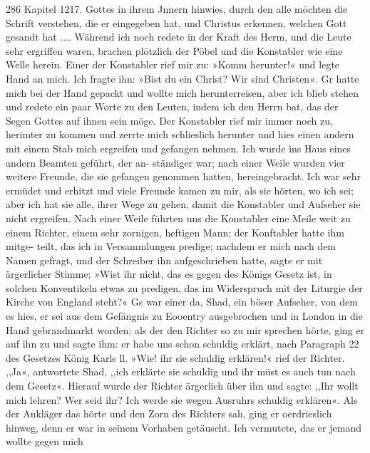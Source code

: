 286 Kapitel 1217.
Gottes in ihrem Jnnern hinwies, durch den alle möchten die
Schrift verstehen, die er eingegeben hat, und Christus erkennen,
welchen Gott gesandt hat .... Während ich noch redete in der
Kraft des Herm, und die Leute sehr ergriffen waren, brachen
plötzlich der Pöbel und die Konstabler wie eine Welle herein.
Einer der Konstabler rief mir zu: »Komm herunter!« und legte
Hand an mich. Ich fragte ihn: »Bist du ein Christ? Wir sind
Christen«. Gr hatte mich bei der Hand gepackt und wollte mich
herunterreisen, aber ich blieb stehen und redete ein paar Worte
zu den Leuten, indem ich den Herrn bat, das der Segen Gottes
auf ihnen sein möge. Der Konstabler rief mir immer noch zu,
herimter zu kommen und zerrte mich schlieslich herunter und hies
einen andern mit einem Stab mich ergreifen und gefangen nehmen.
Ich wurde ins Haus eines andern Beamten geführt, der an-
ständiger war; nach einer Weile wurden vier weitere Freunde,
die sie gefangen genommen hatten, hereingebracht. Ich war sehr
ermüdet und erhitzt und viele Freunde kamen zu mir, als sie
hörten, wo ich sei; aber ich hat sie alle, ihrer Wege zu gehen,
damit die Konstabler und Aufseher sie nicht ergreifen. Nach einer
Weile führten uns die Konstabler eine Meile weit zu einem Richter,
einem sehr zornigen, heftigen Mann; der Konftabler hatte ihm mitge-
teilt, das ich in Versammlungen predige; nachdem er mich nach dem
Namen gefragt, und der Schreiber ihn aufgeschrieben hatte, sagte er
mit ärgerlicher Stimme: »Wist ihr nicht, das es gegen des Königs
Gesetz ist, in solchen Konventikeln etwas zu predigen, das im
Widerspruch mit der Liturgie der Kirche von England steht?«
Gs war einer da, Shad, ein böser Aufseher, von dem es hies,
er sei aus dem Gefängnis zu Eooentry ausgebrochen und in
London in die Hand gebrandmarkt worden; als der den Richter
so zu mir sprechen hörte, ging er auf ihn zu und sagte ihm: er
habe uns schon schuldig erklärt, nach Paragraph 22 des Gesetzes
König Karls ll. »Wie! ihr sie schuldig erklären!« rief der
Richter. ,,Ja«, antwortete Shad, ,,ich erklärte sie schuldig
und ihr müst es auch tun nach dem Gesetz«. Hierauf wurde
der Richter ärgerlich über ihn und sagte: ,,Ihr wollt mich lehren?
Wer seid ihr? Ich werde sie wegen Ausruhrs schuldig erklären«.
Als der Ankläger das hörte und den Zorn des Richters sah,
ging er oerdrieslich hinweg, denn er war in seinem Vorhaben
getäuscht. Ich vermutete, das er jemand wollte gegen mich


